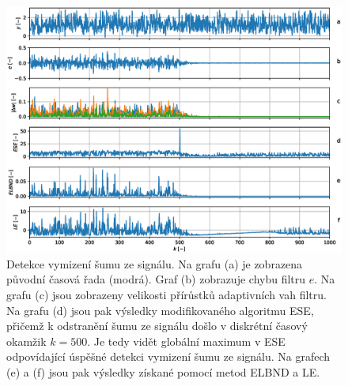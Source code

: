 \begin{figure}[ht!] 
    \centering
    \includegraphics[scale=0.6]{IMG/mdpi/noise_ext.eps} 
    \caption{Detekce vymizení šumu ze signálu. Na grafu (a) je zobrazena původní časová řada (modrá). Graf (b) zobrazuje chybu filtru $e$. Na grafu (c) jsou zobrazeny velikosti přírůstků adaptivních vah filtru. Na grafu (d) jsou pak výsledky modifikovaného algoritmu ESE, přičemž k odstranění šumu ze signálu došlo v diskrétní časový okamžik $k=500$. Je tedy vidět globální maximum v ESE odpovídající úspěšné detekci vymizení šumu ze signálu. Na grafech (e) a (f) jsou pak výsledky získané pomocí metod ELBND a LE.}
    \label{fig:noise_ext}
\end{figure}

